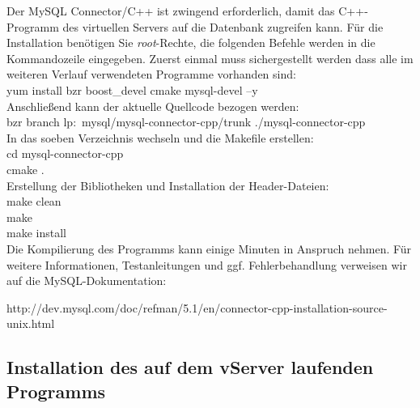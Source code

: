 \documentclass[fontsize = 12pt, paper = a4]{scrreprt}
\begin{document}
Der MySQL Connector/C++ ist zwingend erforderlich, damit das C++-Programm des virtuellen Servers auf die Datenbank zugreifen kann. Für die Installation benötigen Sie \textit{root}-Rechte, die folgenden Befehle werden in die Kommandozeile eingegeben.
Zuerst einmal muss sichergestellt werden dass alle im weiteren Verlauf verwendeten Programme vorhanden sind:\\
  yum install bzr boost\_devel cmake mysql-devel –y \\

Anschließend kann der aktuelle Quellcode bezogen werden:\\
  bzr branch lp:~mysql/mysql-connector-cpp/trunk ./mysql-connector-cpp \\

In das soeben Verzeichnis wechseln und die Makefile erstellen:\\
  cd mysql-connector-cpp \\
  cmake . \\

Erstellung der Bibliotheken und Installation der Header-Dateien: \\
  make clean \\
  make \\
  make install \\

Die Kompilierung des Programms kann einige Minuten in Anspruch nehmen. Für weitere Informationen, Testanleitungen und ggf. Fehlerbehandlung verweisen wir auf die MySQL-Dokumentation:

 http://dev.mysql.com/doc/refman/5.1/en/connector-cpp-installation-source-unix.html
 
 \subsection{Installation des auf dem vServer laufenden Programms}
 
 
\end{document}
